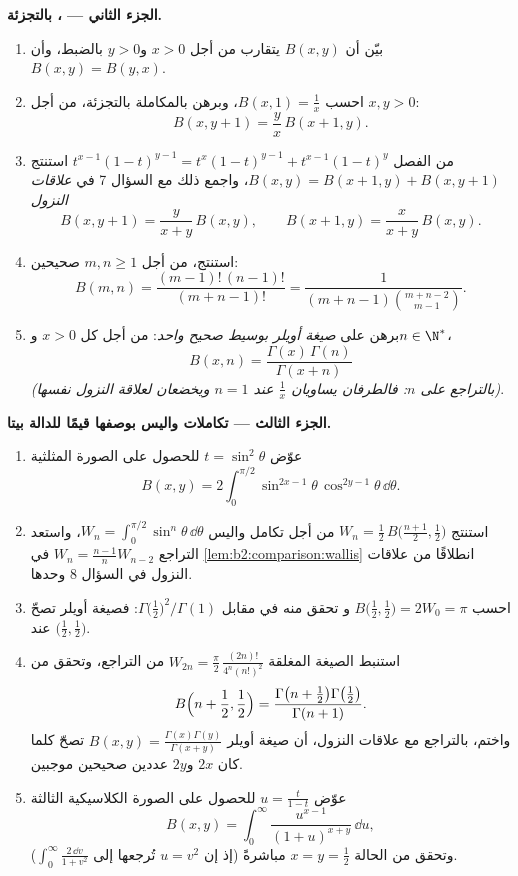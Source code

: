 \begin{problem}
\medskip
\noindent\textbf{الجزء الثاني --- ، بالتجزئة.}
\begin{enumerate}[resume]
  \item بيّن أن $B(x,y)$ يتقارب من أجل $x > 0$ و$y >
        0$ بالضبط، وأن $B(x,y) = B(y,x)$.
  \item احسب $B(x, 1) = \frac1x$، وبرهن بالمكاملة بالتجزئة، من أجل
        $x, y > 0$:
        \[
        B(x, y+1) = \frac{y}{x}\,B(x+1, y) .
        \]
  \item من الفصل $t^{x-1}(1-t)^{y-1} =
        t^{x}(1-t)^{y-1} + t^{x-1}(1-t)^{y}$ استنتج $B(x,y) =
        B(x+1,y) + B(x,y+1)$، واجمع ذلك مع السؤال 7 في
        \emph{علاقات النزول}
        \[
        B(x, y+1) = \frac{y}{x+y}\,B(x,y),
        \qquad
        B(x+1, y) = \frac{x}{x+y}\,B(x,y) .
        \]
  \item استنتج، من أجل $m, n \geq 1$ صحيحين:
        \[
        B(m, n) = \frac{(m-1)!\,(n-1)!}{(m+n-1)!}
        = \frac{1}{(m+n-1)\binom{m+n-2}{m-1}} .
        \]
  \item برهن على \emph{صيغة أويلر بوسيط صحيح واحد}:
        من أجل كل $x > 0$ و$n \in \N^*$،
        \[
        B(x, n) = \frac{\Gamma(x)\,\Gamma(n)}{\Gamma(x + n)}
        \]
        \emph{(بالتراجع على $n$: فالطرفان يساويان $\frac1x$ عند $n
        = 1$ ويخضعان لعلاقة النزول نفسها)}.
\end{enumerate}

\medskip
\noindent\textbf{الجزء الثالث --- تكاملات واليس بوصفها قيمًا للدالة بيتا.}
\begin{enumerate}[resume]
  \item عوّض $t = \sin^2\theta$ للحصول على الصورة
        المثلثية
        \[
        B(x, y) = 2\int_0^{\pi/2}
        \sin^{2x-1}\theta\,\cos^{2y-1}\theta\,\dd\theta .
        \]
  \item استنتج $W_n = \frac12\,B\bigl(\frac{n+1}2, \frac12\bigr)$
        من أجل تكامل واليس $W_n = \int_0^{\pi/2}\sin^n
        \theta\,\dd\theta$، واستعد التراجع $W_n =
        \frac{n-1}{n}W_{n-2}$ في \cref{lem:b2:comparison:wallis}
        انطلاقًا من علاقات النزول في السؤال 8 وحدها.
  \item احسب $B\bigl(\frac12, \frac12\bigr) = 2W_0 = \pi$ و
        تحقق منه في مقابل $\Gamma\bigl(\frac12\bigr)^2/\Gamma(1)$:
        فصيغة أويلر تصحّ عند $\bigl(\frac12,
        \frac12\bigr)$.
  \item استنبط الصيغة المغلقة $W_{2n} = \frac\pi2\,
        \frac{(2n)!}{4^n(n!)^2}$ من التراجع، وتحقق من
        \[
        B\Bigl(n + \frac12, \frac12\Bigr)
        = \frac{\Gamma\bigl(n + \frac12\bigr)\Gamma\bigl(
        \frac12\bigr)}{\Gamma(n+1)} .
        \]
        واختم، بالتراجع مع علاقات النزول، أن صيغة
        أويلر $B(x,y) =
        \frac{\Gamma(x)\Gamma(y)}{\Gamma(x+y)}$ تصحّ كلما كان
        $2x$ و$2y$ عددين صحيحين موجبين.
  \item عوّض $u = \frac{t}{1-t}$ للحصول على الصورة
        الكلاسيكية الثالثة
        \[
        B(x,y) = \int_0^\infty
        \frac{u^{x-1}}{(1+u)^{x+y}}\,\dd u ,
        \]
        وتحقق من الحالة $x = y = \frac12$ مباشرةً (إذ إن $u = v^2$
        تُرجعها إلى $\int_0^\infty\frac{2\,\dd v}{1+v^2}$).
\end{enumerate}


\end{problem}
